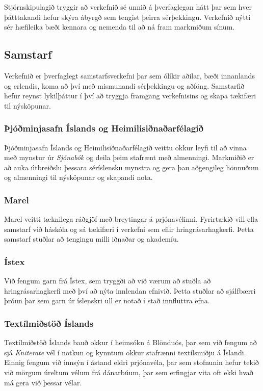 \documentclass[a4paper,12pt,twoside]{article}
\begin{document}
Stjórnskipulagið tryggir að verkefnið sé unnið á þverfaglegan hátt þar sem hver þátttakandi hefur skýra ábyrgð sem tengist þeirra sérþekkingu. Verkefnið nýtti sér hæfileika bæði kennara og nemenda til að ná fram markmiðum sínum.


\subsection{Samstarf}
Verkefnið er þverfaglegt samstarfsverkefni þar sem ólíkir aðilar, bæði innanlands og erlendis, koma að því með mismunandi sérþekkingu og aðföng. Samstarfið hefur reynst lykilþáttur í því að tryggja framgang verkefnisins og skapa tækifæri til nýsköpunar.

\subsubsection{Þjóðminjasafn Íslands og Heimilisiðnaðarfélagið}
Þjóðminjasafn Íslands og Heimilisiðnaðarfélagið veittu okkur leyfi til að vinna með mynstur úr \textit{Sjónabók} og deila þeim stafrænt með almenningi. Markmiðið er að auka útbreiðslu þessara sér\-íslensku mynstra og gera þau aðgengileg hönnuðum og almenningi til nýsköpunar og skapandi nota.

\subsubsection{Marel}
Marel veitti tæknilega ráðgjöf með breytingar á prjónavélinni. Fyrirtækið vill efla samstarf við háskóla og sá tækifæri í verkefni sem eflir hringrásarhagkerfi. Þetta samstarf stuðlar að tengingu milli iðnaðar og akademíu.

\subsubsection{Ístex}
Við fengum garn frá Ístex, sem tryggði að við værum að stuðla að hringrásarhagkerfi með því að nýta innlendan efnivið. Þetta stuðlar að sjálfbærri þróun þar sem garn úr íslenskri ull er notað í stað innfluttra efna.

\subsubsection{Textílmiðstöð Íslands}
Textílmiðstöð Íslands bauð okkur í heimsókn á Blönduós, þar sem við fengum að sjá \textit{Kniterate} vél í notkun og kynntum okkur stafrænni textílsmiðju á Íslandi. Einnig fengum við innsýn í ástand eldri prjónavéla, þar sem stofnunin hefur tekið við mörgum úreltum vélum frá dánarbúum, þar sem erfingjar vita oft ekki hvað má gera við þessar vélar.
\end{document}
